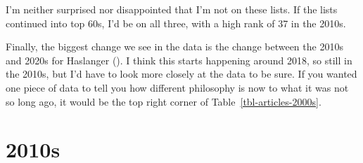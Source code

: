 \documentclass[
  10pt,
  letterpaper,
  DIV=11,
  numbers=noendperiod,
  twoside]{scrartcl}
\begin{document}
I'm neither surprised nor disappointed that I'm not on these lists. If
the lists continued into top 60s, I'd be on all three, with a high rank
of 37 in the 2010s.

Finally, the biggest change we see in the data is the change between the
2010s and 2020s for Haslanger ().
I think this starts happening around 2018, so still in the 2010s, but
I'd have to look more closely at the data to be sure. If you wanted one
piece of data to tell you how different philosophy is now to what it was
not so long ago, it would be the top right corner of
Table~\ref{tbl-articles-2000s}.

\section{2010s}\label{s-4}
\end{document}
